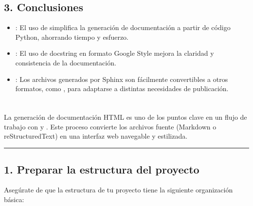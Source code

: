 \documentclass[a4paper,10pt,oneside,spanish,openany]{sphinxmanual}
\begin{document}
\subsection{3. Conclusiones}
\label{\detokenize{configuracion_inicial/007.Creacion_de_ficheros_de_codigo_y_generacion_automatica_de_documentacion:conclusiones}}\begin{itemize}
\item {} 
\sphinxAtStartPar
{}: El uso de  simplifica la generación de documentación a partir de código Python, ahorrando tiempo y esfuerzo.

\item {} 
\sphinxAtStartPar
{}: El uso de docstring en formato Google Style mejora la claridad y consistencia de la documentación.

\item {} 
\sphinxAtStartPar
{}: Los archivos  generados por Sphinx son fácilmente convertibles a otros formatos, como , para adaptarse a distintas necesidades de publicación.

\end{itemize}

\sphinxstepscope


\section{}
\label{\detokenize{configuracion_inicial/008.Generar_HTML:generacion-de-html-a-partir-de-la-documentacion}}\label{\detokenize{configuracion_inicial/008.Generar_HTML::doc}}
\sphinxAtStartPar
La generación de documentación HTML es uno de los puntos clave en un flujo de trabajo con  y . Este proceso convierte los archivos fuente (Markdown o reStructuredText) en una interfaz web navegable y estilizada.


\bigskip\hrule\bigskip



\subsection{1. Preparar la estructura del proyecto}
\label{\detokenize{configuracion_inicial/008.Generar_HTML:preparar-la-estructura-del-proyecto}}
\sphinxAtStartPar
Asegúrate de que la estructura de tu proyecto tiene la siguiente organización básica:
\end{document}
